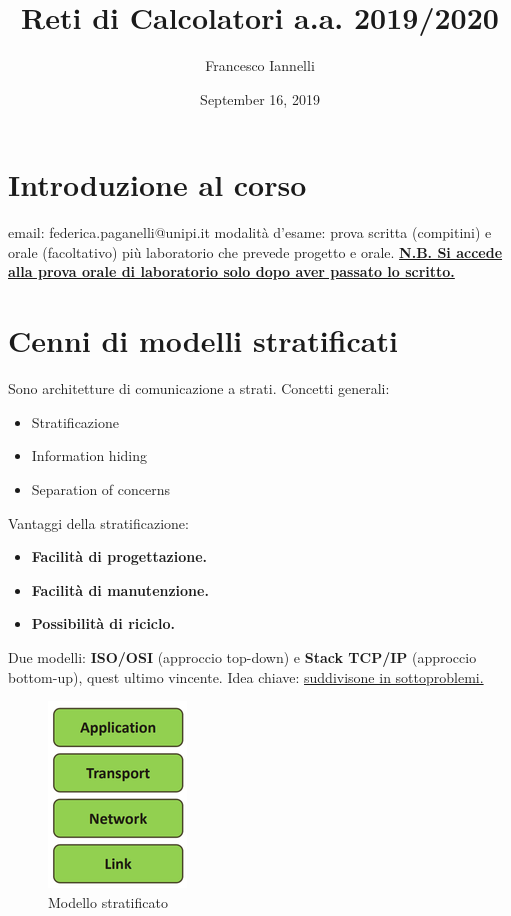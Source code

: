 \documentclass[11pt,a4paper]{article}
\theoremstyle{definition}
\begin{document}
\title{Reti di Calcolatori a.a. 2019/2020}
\author{Francesco Iannelli}
\date{September 16, 2019}
\maketitle

\newpage

\tableofcontents
\newpage

\section{Introduzione al corso}
email: federica.paganelli@unipi.it\newline
modalità d'esame: prova scritta (compitini) e orale (facoltativo) più\newline
laboratorio che prevede progetto e orale. \newline
\underline{\textbf{N.B. Si accede alla prova orale di laboratorio solo dopo aver passato lo scritto.}}

\section{Cenni di modelli stratificati}
Sono architetture di comunicazione a strati. \newline
Concetti generali:
\begin{itemize}
	\item Stratificazione
	\item Information hiding
	\item Separation of concerns
\end{itemize}
Vantaggi della stratificazione:
\begin{itemize}
	\item \textbf{Facilità di progettazione.}
	\item \textbf{Facilità di manutenzione.}
	\item \textbf{Possibilità di riciclo.}
\end{itemize}
Due modelli: \textbf{ISO/OSI} (approccio top-down) e \textbf{Stack TCP/IP} (approccio bottom-up), quest ultimo vincente.\newline
Idea chiave: \underline{suddivisone in sottoproblemi.}
\begin{figure}[!h]
	\includegraphics[scale=0.8]{Immagini/Modelli_Strat.png}
	\centering
	\caption{Modello stratificato}
\end{figure}
\end{document}
